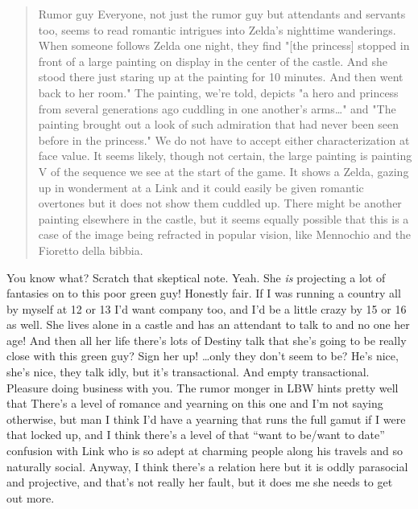   \begin{quote}Rumor guy
  Everyone, not just the rumor guy but attendants and servants too, seems to read romantic intrigues into Zelda's nighttime wanderings. When someone follows Zelda one night, they find "[the princess] stopped in front of a large painting on display in the center of the castle. And she stood there just staring up at the painting for 10 minutes. And then went back to her room."  
  The painting, we're told, depicts "a hero and princess from several generations ago cuddling in one another’s arms\ldots" and "The painting brought out a look of such admiration that had never been seen before in the princess." We do not have to accept either characterization at face value. It seems likely, though not certain, the large painting is painting V of the sequence we see at the start of the game. It shows a Zelda, gazing up in wonderment at a Link and it could easily be given romantic overtones but it does not show them cuddled up. There might be another painting elsewhere in the castle, but it seems equally possible that this is a case of the image being refracted in popular vision, like Mennochio and the Fioretto della bibbia.\end{quote}


  You know what? Scratch that skeptical note. Yeah. She \emph{is} projecting a lot of fantasies on to this poor green guy! Honestly fair. If I was running a country all by myself at 12 or 13 I'd want company too, and I'd be a little crazy by 15 or 16 as well. She lives alone in a castle and has an attendant to talk to and no one her age!
  And then all her life there's lots of Destiny talk that she's going to be really close with this green guy? Sign her up!
  \ldots only they don't seem to be?
  He's nice, she's nice, they talk idly, but it's transactional.
  And empty transactional. Pleasure doing business with you.
  The rumor monger in LBW hints pretty well that There's a level of romance and yearning on this one and I'm not saying otherwise, but man I think I'd have a yearning that runs the full gamut if I were that locked up, and I think there's a level of that ``want to be/want to date'' confusion with Link who is so adept at charming people along his travels and so naturally social. Anyway, I think there's a relation here but it is oddly parasocial and projective, and that's not really her fault, but it does me she needs to get out more.
